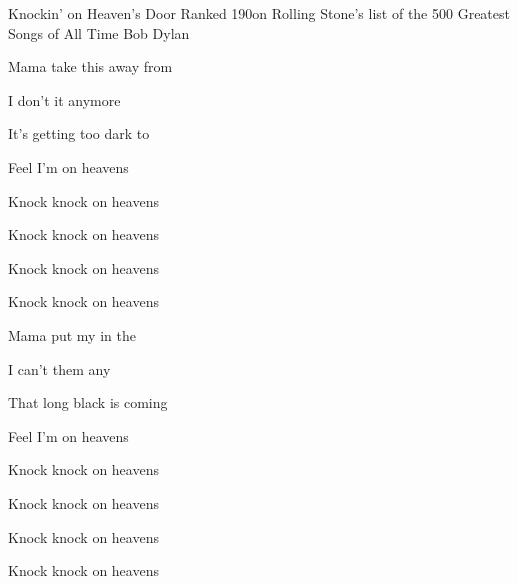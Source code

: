 \begin{SBSong}{Knockin' on Heaven's Door}
  {Ranked 190\th on Rolling Stone's list of the 500 Greatest Songs of All Time}
  {Bob Dylan}
  \begin{SBVerse}
 	Mama take this  away from 

 	I don't  it anymore 

 	It's getting  too dark to 

 	Feel I'm  on heavens  
  \end{SBVerse}
  \begin{SBChorus}   	 
 	Knock knock  on heavens 
 	
	Knock knock  on heavens 
	
	Knock knock  on heavens 
	
	Knock knock  on heavens 
  \end{SBChorus}  
  \begin{SBVerse}
 	Mama put my  in the 

 	 I can't  them any

 	That long black  is coming 

 	Feel I'm  on heavens 
  \end{SBVerse}
  \begin{SBChorus}   	 
 	Knock knock  on heavens 
 	
	Knock knock  on heavens 
	
	Knock knock  on heavens 
	
	Knock knock  on heavens 
  \end{SBChorus} 
\end{SBSong}
